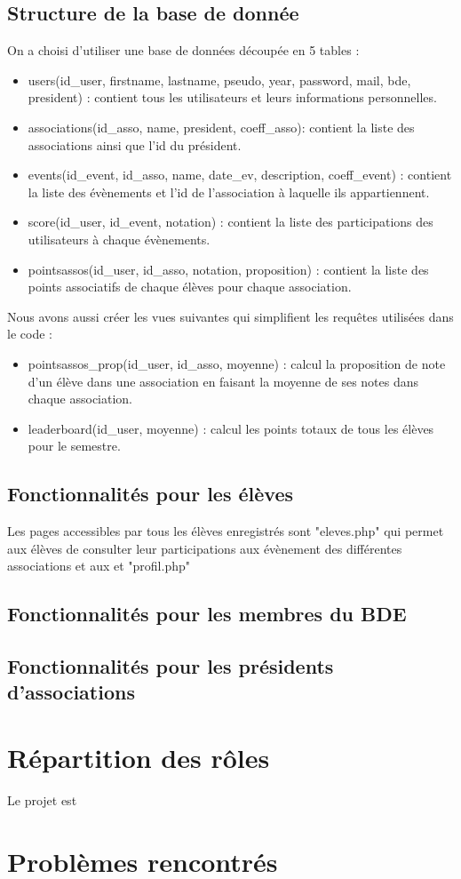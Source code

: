 \documentclass[french]{article}
\begin{document}
 \subsection{Structure de la base de donnée}
 On a choisi d'utiliser une base de données découpée en 5 tables : 
 \begin{itemize}
 	\item users(id\_user, firstname, lastname, pseudo, year, password, mail, bde, president) : contient tous les utilisateurs et leurs informations personnelles.
 	\item associations(id\_asso, name, president, coeff\_asso): contient la liste des associations ainsi que l'id du président.
 	\item events(id\_event, id\_asso, name, date\_ev, description, coeff\_event) : contient la liste des évènements et l'id de l'association à laquelle ils appartiennent.
 	\item score(id\_user, id\_event, notation) : contient la liste des participations des utilisateurs à chaque évènements.
 	\item pointsassos(id\_user, id\_asso, notation, proposition) : contient la liste des points associatifs de chaque élèves pour chaque association.\\
 \end{itemize} 

Nous avons aussi créer les vues suivantes qui simplifient les requêtes utilisées dans le code : 
\begin{itemize}
	\item pointsassos\_prop(id\_user, id\_asso, moyenne) : calcul la proposition de note d'un élève dans une association en faisant la moyenne de ses notes dans chaque association.
	\item leaderboard(id\_user, moyenne) : calcul les points totaux de tous les élèves pour le semestre.
\end{itemize}
\subsection{Fonctionnalités pour les élèves}
	Les pages accessibles par tous les élèves enregistrés sont "eleves.php" qui permet aux élèves de consulter leur participations aux évènement des différentes associations et aux et "profil.php"
\subsection{Fonctionnalités pour les membres du BDE}
\subsection{Fonctionnalités pour les présidents d'associations}	
\section{Répartition des rôles}
Le projet est  

\section{Problèmes rencontrés}
\end{document}
